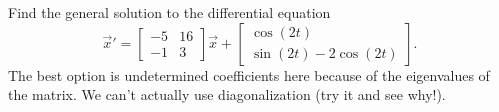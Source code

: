 \documentclass{ximera}
\begin{document}
\begin{exercise}
    Find the general solution to the differential equation
    \begin{equation*}
        {\vec{x}}' = \begin{bmatrix} -5 & 16 \\ -1 & 3 \end{bmatrix} \vec{x} + \begin{bmatrix} \cos(2t) \\ \sin(2t) - 2\cos(2t) \end{bmatrix}. 
    \end{equation*}
    The best option is undetermined coefficients here because of the eigenvalues of the matrix. We can't actually use diagonalization (try it and see why!).
\end{exercise}
\end{document}
